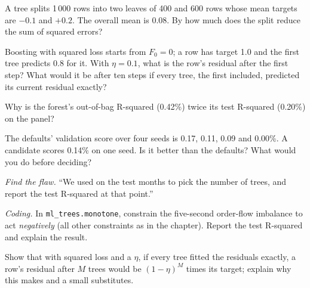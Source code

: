 \begin{exercise}[$\star$]\label{exo:ml:trees-and-boosting:2}
A tree splits 1\,000 rows into two leaves of 400 and 600 rows whose mean targets are $-0.1$ and $+0.2$. The overall
mean is $0.08$. By how much does the split reduce the sum of squared errors?
\end{exercise}

\begin{exercise}[$\star$]\label{exo:ml:trees-and-boosting:3}
Boosting with squared loss starts from $F_0 = 0$; a row has target 1.0 and the first tree predicts 0.8 for it. With
$\eta = 0.1$, what is the row's residual after the first step? What would it be after ten steps if every tree, the first
included, predicted its current residual exactly?
\end{exercise}

\begin{exercise}[$\star\star$]\label{exo:ml:trees-and-boosting:4}
Why is the forest's out-of-bag R-squared (0.42\%) twice its test R-squared (0.20\%) on the panel?
\end{exercise}

\begin{exercise}[$\star\star$]\label{exo:ml:trees-and-boosting:5}
The defaults' validation score over four seeds is 0.17, 0.11, 0.09 and 0.00\%. A candidate scores 0.14\% on one seed.
Is it better than the defaults? What would you do before deciding?
\end{exercise}

\begin{exercise}[$\star\star$]\label{exo:ml:trees-and-boosting:6}
\emph{Find the flaw.} ``We used  on the test months to pick the number of trees, and report the test
R-squared at that point.''
\end{exercise}

\begin{exercise}[$\star\star\star$]\label{exo:ml:trees-and-boosting:7}
\emph{Coding.} In \texttt{ml\_trees.monotone}, constrain the five-second order-flow imbalance to act \emph{negatively}
(all other constraints as in the chapter). Report the test R-squared and explain the result.
\end{exercise}

\begin{exercise}[$\star\star\star$]\label{exo:ml:trees-and-boosting:8}
Show that with squared loss and a  $\eta$, if every tree fitted the residuals exactly, a row's residual after
$M$ trees would be $(1 - \eta)^M$ times its target; explain why this makes  and a small 
substitutes.
\end{exercise}

